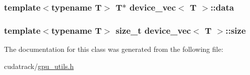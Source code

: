 \subsubsection[{\texorpdfstring{data}{data}}]{\setlength{\rightskip}{0pt plus 5cm}template$<$typename T$>$ T$\ast$ {\bf device\+\_\+vec}$<$ T $>$\+::data}\hypertarget{classdevice__vec_a908e53910a02968513832c242790caa0}{}\label{classdevice__vec_a908e53910a02968513832c242790caa0}
\subsubsection[{\texorpdfstring{size}{size}}]{\setlength{\rightskip}{0pt plus 5cm}template$<$typename T$>$ size\+\_\+t {\bf device\+\_\+vec}$<$ T $>$\+::size}\hypertarget{classdevice__vec_a1452496fe02af53427d0284e2bb6ca6e}{}\label{classdevice__vec_a1452496fe02af53427d0284e2bb6ca6e}


The documentation for this class was generated from the following file\+:\begin{DoxyCompactItemize}
\item 
cudatrack/\hyperlink{gpu__utils_8h}{gpu\+\_\+utils.\+h}\end{DoxyCompactItemize}
